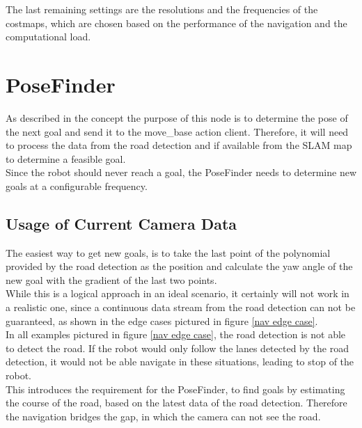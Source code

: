The last remaining settings are the resolutions and the frequencies of the costmaps, which are chosen based on the performance of the navigation and the computational load.

 
\section{PoseFinder}
As described in the concept the purpose of this node is to determine the pose of the next goal and send it to the move\_base action client. Therefore, it will need to process the data from the road detection and if available from the SLAM map to determine a feasible goal.\\

Since the robot should never reach a goal, the PoseFinder needs to determine new goals at a configurable frequency. 

\subsection{Usage of Current Camera Data}


The easiest way to get new goals, is to take the last point of the polynomial provided by the road detection as the position and calculate the yaw angle of the new goal with the gradient of the last two points.\\

While this is a logical approach in an ideal scenario, it certainly will not work in a realistic one, since a continuous data stream from the road detection can not be guaranteed, as shown in the edge cases pictured in figure \ref{nav edge case}.\\

In all examples pictured in figure \ref{nav edge case}, the road detection is not able to detect the road. If the robot would only follow the lanes detected by the road detection, it would not be able navigate in these situations, leading to stop of the robot.\\

This introduces the requirement for the PoseFinder, to find goals by estimating the course of the road, based on the latest data of the road detection. Therefore the navigation bridges the gap, in which the camera can not see the road.\\

